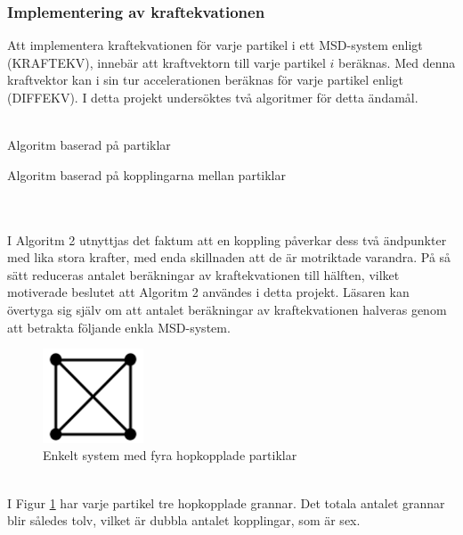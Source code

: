 \documentclass[a4paper,12pt,oneside,final,swedish]{extarticle}
\begin{document}
\subsubsection{Implementering av kraftekvationen}
Att implementera kraftekvationen för varje partikel i ett MSD-system enligt (KRAFTEKV), innebär att kraftvektorn till varje partikel $i$ beräknas. Med denna kraftvektor kan i sin tur accelerationen beräknas för varje partikel enligt (DIFFEKV). I detta projekt undersöktes två algoritmer för detta ändamål.\\\\
\begin{algorithm}[H]
\caption{Algoritm baserad på partiklar\label{alg2}}
\end{algorithm}
\begin{algorithm}[H]
\caption{Algoritm baserad på kopplingarna mellan partiklar\label{alg3}}
\end{algorithm}
\noindent \\\\I Algoritm 2 utnyttjas det faktum att en koppling påverkar dess två ändpunkter med lika stora krafter, med enda skillnaden att de är motriktade varandra. På så sätt reduceras antalet beräkningar av kraftekvationen till hälften, vilket motiverade beslutet att Algoritm 2 användes i detta projekt. Läsaren kan övertyga sig själv om att antalet beräkningar av kraftekvationen halveras genom att betrakta följande enkla MSD-system.
\begin{figure}[h!]
  \begin{center}
    \includegraphics[width=3cm]{Bilder/2D_2x2.png} 
  \end{center}
  \caption{Enkelt system med fyra hopkopplade partiklar}
  \label{enkelfyra}
\end{figure}
\\I Figur \ref{enkelfyra} har varje partikel tre hopkopplade grannar. Det totala antalet grannar blir således tolv, vilket är dubbla antalet kopplingar, som är sex.
\end{document}
